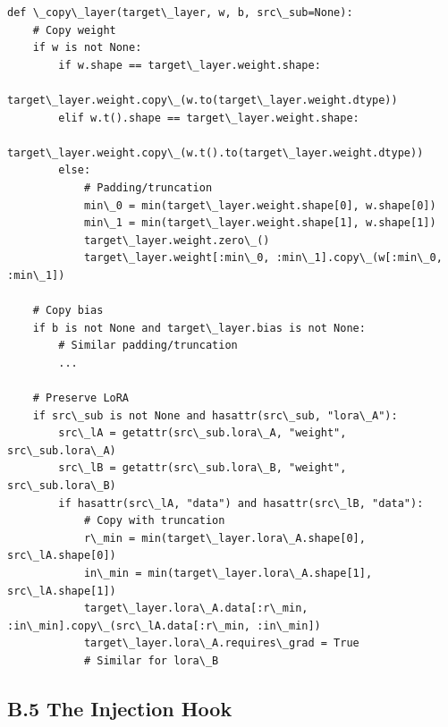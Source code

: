 \begin{lstlisting}
def \_copy\_layer(target\_layer, w, b, src\_sub=None):
    # Copy weight
    if w is not None:
        if w.shape == target\_layer.weight.shape:
            target\_layer.weight.copy\_(w.to(target\_layer.weight.dtype))
        elif w.t().shape == target\_layer.weight.shape:
            target\_layer.weight.copy\_(w.t().to(target\_layer.weight.dtype))
        else:
            # Padding/truncation
            min\_0 = min(target\_layer.weight.shape[0], w.shape[0])
            min\_1 = min(target\_layer.weight.shape[1], w.shape[1])
            target\_layer.weight.zero\_()
            target\_layer.weight[:min\_0, :min\_1].copy\_(w[:min\_0, :min\_1])
    
    # Copy bias
    if b is not None and target\_layer.bias is not None:
        # Similar padding/truncation
        ...
    
    # Preserve LoRA
    if src\_sub is not None and hasattr(src\_sub, "lora\_A"):
        src\_lA = getattr(src\_sub.lora\_A, "weight", src\_sub.lora\_A)
        src\_lB = getattr(src\_sub.lora\_B, "weight", src\_sub.lora\_B)
        if hasattr(src\_lA, "data") and hasattr(src\_lB, "data"):
            # Copy with truncation
            r\_min = min(target\_layer.lora\_A.shape[0], src\_lA.shape[0])
            in\_min = min(target\_layer.lora\_A.shape[1], src\_lA.shape[1])
            target\_layer.lora\_A.data[:r\_min, :in\_min].copy\_(src\_lA.data[:r\_min, :in\_min])
            target\_layer.lora\_A.requires\_grad = True
            # Similar for lora\_B
\end{lstlisting}

\subsection{B.5 The Injection Hook}

